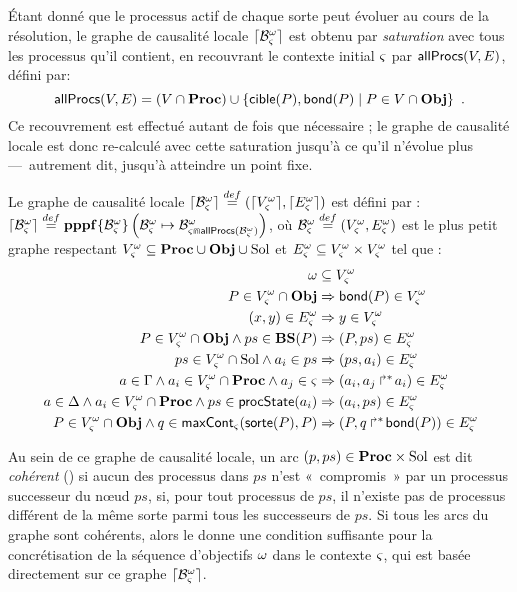 Étant donné que le processus actif de chaque sorte peut évoluer au cours de la résolution,
le graphe de causalité locale $\lceil \mathcal{B}_\varsigma^\omega\rceil$ est obtenu par \emph{saturation} avec tous les processus
qu'il contient, \cad en recouvrant le contexte initial $\varsigma$ par $\mathsf{allProcs}(V, E)$, défini par:
  \[\mathsf{allProcs}(V, E) = (V \cap \mathbf{Proc}) \cup
    \{ \mathsf{cible}(P), \mathsf{bond}(P) \mid P \in V \cap \mathbf{Obj} \} \enspace.\]
Ce recouvrement est effectué autant de fois que nécessaire ;
le graphe de causalité locale est donc re-calculé avec cette saturation
jusqu'à ce qu'il n'évolue plus ---~autrement dit, jusqu'à atteindre un point fixe.

\begin{definition}
  Le graphe de causalité locale $\lceil \mathcal{B}_\varsigma^\omega\rceil \stackrel{def}= (\lceil V_\varsigma^\omega\rceil, \lceil E_\varsigma^\omega\rceil)$ est défini par :
  $\lceil \mathcal{B}_\varsigma^\omega\rceil \stackrel{def}= \mathbf{pppf}\{\mathcal{B}^\omega_\varsigma\}\left(\mathcal{B}^\omega_\varsigma\mapsto\mathcal{B}^\omega_{\varsigma \Cap \mathsf{allProcs}(\mathcal{B}^\omega_\varsigma)}\right)$,
  où $\mathcal{B}^\omega_\varsigma \stackrel{def}= (V_\varsigma^\omega, E_\varsigma^\omega)$ est le plus petit graphe respectant
  $V_\varsigma^\omega \subseteq \mathbf{Proc} \cup \mathbf{Obj} \cup \mathrm{Sol}$ et $E_\varsigma^\omega \subseteq V_\varsigma^\omega \times V_\varsigma^\omega$
  tel que :
  \begin{align}
    \omega &\subseteq V_\varsigma^\omega \label{eq:Vw} \\
    P \in V_\varsigma^\omega \cap \mathbf{Obj} &\Rightarrow \mathsf{bond}(P) \in V_\varsigma^\omega \label{eq:Vproc} \\
    (x, y) \in E_\varsigma^\omega &\Rightarrow y \in V_\varsigma^\omega \label{eq:VE} \\
    P \in V_\varsigma^\omega \cap \mathbf{Obj} \wedge ps \in \mathbf{BS}(P) &\Rightarrow (P, ps) \in E_\varsigma^\omega \label{eq:ESol1} \\
    ps \in V_\varsigma^\omega \cap \mathrm{Sol} \wedge a_i \in ps &\Rightarrow (ps, a_i) \in E_\varsigma^\omega \label{eq:ESol2} \\
    a \in \Gamma \wedge a_i \in V_\varsigma^\omega \cap \mathbf{Proc} \wedge a_j \in \varsigma &\Rightarrow (a_i, \mbox{${a}_{j}\Rsh^*\!{a}_{i}$}) \in E_\varsigma^\omega \label{eq:EReq} \\
    a \in \Delta \wedge a_i \in V_\varsigma^\omega \cap \mathbf{Proc} \wedge ps \in \mathsf{procState}(a_i) &\Rightarrow (a_i, ps) \in E_\varsigma^\omega \label{eq:EPrio} \\
    P \in V_\varsigma^\omega \cap \mathbf{Obj} \wedge q \in \mathsf{maxCont}_\varsigma(\mathsf{sorte}(P), P) &\Rightarrow (P, \mbox{$q\Rsh^*\!\mathsf{bond}(P)$}) \in E_\varsigma^\omega \label{eq:ECont} \!
  \end{align}
\end{definition}

Au sein de ce graphe de causalité locale, un arc $(p, ps) \in \mathbf{Proc} \times \mathrm{Sol}$
est dit \emph{cohérent} () si aucun des processus dans $ps$
n'est «~compromis~» par un processus successeur du nœud $ps$,
\cad si, pour tout processus de $ps$,
il n'existe pas de processus différent de la même sorte parmi tous les successeurs de $ps$.
%
Si tous les arcs du graphe sont cohérents, alors le 
donne une condition suffisante pour la concrétisation de la séquence d'objectifs $\omega$
dans le contexte $\varsigma$, qui est basée directement sur ce graphe $\lceil \mathcal{B}_\varsigma^\omega\rceil$.

